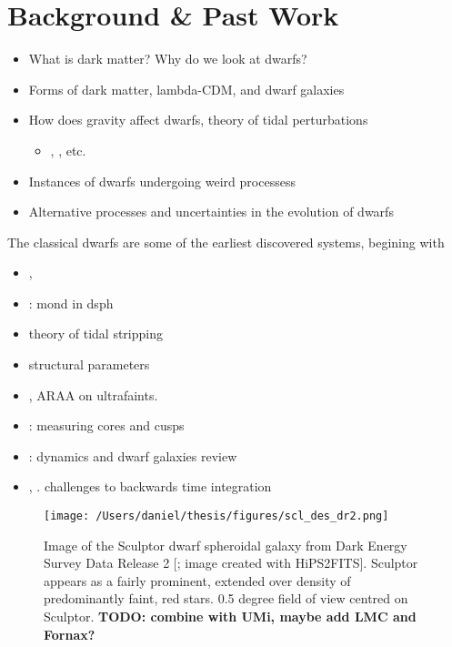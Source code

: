 \section{Background \& Past Work}\label{background-past-work}

\begin{itemize}
\tightlist
\item
  What is dark matter? Why do we look at dwarfs?
\item
  Forms of dark matter, lambda-CDM, and dwarf galaxies
\item
  How does gravity affect dwarfs, theory of tidal perturbations

  \begin{itemize}
  \tightlist
  \item
    \citet{EN2021}, \citet{PNM2008}, etc.
  \end{itemize}
\item
  Instances of dwarfs undergoing weird processess
\item
  Alternative processes and uncertainties in the evolution of dwarfs
\end{itemize}

The classical dwarfs are some of the earliest discovered systems,
begining with \citet{shapley1938}

\begin{itemize}
\tightlist
\item
  \citet{fattahi+2013}, \citet{fattahi+2018}
\item
  \citet{sanchez-salcedo+hernandez2007}: mond in dsph
\item
  \citet{mayer+2001} theory of tidal stripping
\item
  \citet{IH1995} structural parameters
\item
  \citet{mateo1998}, \citet{simon2019} ARAA on ultrafaints.
\item
  \citet{walker+penarrubia2011}: measuring cores and cusps
\item
  \citet{battaglia+nipoti2022}: dynamics and dwarf galaxies review
\item
  \citet{dsouza+bell2022}, \citet{santistevan+2024}. challenges to
  backwards time integration
\end{itemize}

\begin{figure}
\centering
\texttt{[image: /Users/daniel/thesis/figures/scl\_des\_dr2.png]}
\caption[Picture of Sculptor]{Image of the Sculptor dwarf spheroidal
galaxy from Dark Energy Survey Data Release 2 {[}\citet{abbott+2021};
image created with HiPS2FITS{]}. Sculptor appears as a fairly prominent,
extended over density of predominantly faint, red stars. 0.5 degree
field of view centred on Sculptor. \textbf{TODO: combine with UMi, maybe
add LMC and Fornax?}}\label{fig:scl_image}
\end{figure}

